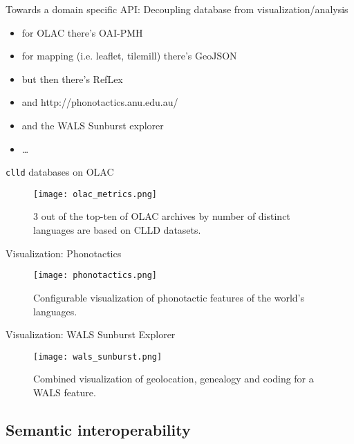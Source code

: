 \documentclass{beamer}
\begin{document}
\begin{frame}{Towards a domain specific API: Decoupling database from visualization/analysis}
\begin{itemize}
\item for OLAC there's OAI-PMH
\item for mapping (i.e. leaflet, tilemill) there's GeoJSON
\item but then there's RefLex
\item and http://phonotactics.anu.edu.au/
\item and the WALS Sunburst explorer
\item \dots
\end{itemize}
\end{frame}

\begin{frame}{\texttt{clld} databases on OLAC}
\begin{figure}
\texttt{[image: olac\_metrics.png]}
\caption{\label{fig:zenodo}3 out of the top-ten of OLAC archives by number of distinct languages
are based on CLLD datasets.}
\end{figure}
\end{frame}


\begin{frame}{Visualization: Phonotactics}
\begin{figure}
\texttt{[image: phonotactics.png]}
\caption{\label{fig:zenodo}Configurable visualization of phonotactic features of the
world's languages.}
\end{figure}
\end{frame}


\begin{frame}{Visualization: WALS Sunburst Explorer}
\begin{figure}
\texttt{[image: wals\_sunburst.png]}
\caption{\label{fig:zenodo}Combined visualization of geolocation, genealogy and coding
for a WALS feature.}
\end{figure}
\end{frame}


%
%
\subsection{Semantic interoperability}
\end{document}
